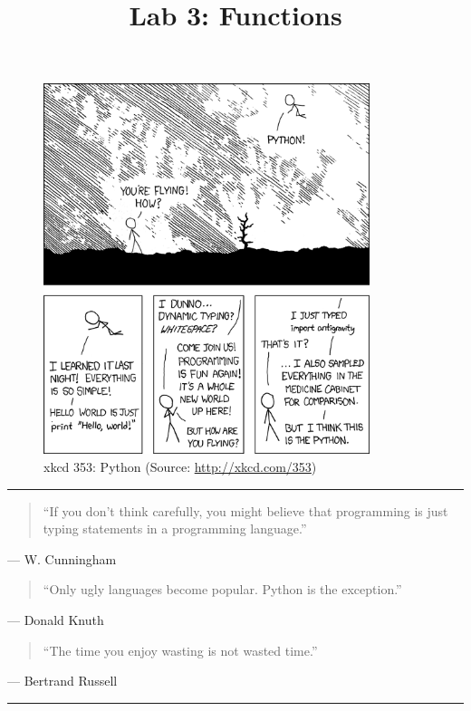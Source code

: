 \documentclass[11pt]{cselabheader}
\title{Lab 3: Functions}
\begin{document}
\maketitle

\begin{figure}[H]
  \centering
  \includegraphics[width=0.85\textwidth]{img/xkcd_python.png}
  \caption{xkcd 353: Python (Source: \url{http://xkcd.com/353})}
\end{figure}

\pagebreak
\hrule
\begin{quotation}
``If you don't think carefully, you might believe that programming is just
typing statements in a programming language.''
\end{quotation}
\begin{flushright}
  --- W. Cunningham
\end{flushright}

\begin{quotation}
``Only ugly languages become popular. Python is the exception.''
\end{quotation}
\begin{flushright}
  --- Donald Knuth
\end{flushright}

\begin{quotation}
``The time you enjoy wasting is not wasted time.''
\end{quotation}
\begin{flushright}
  --- Bertrand Russell
\end{flushright}
\hrule
\end{document}
